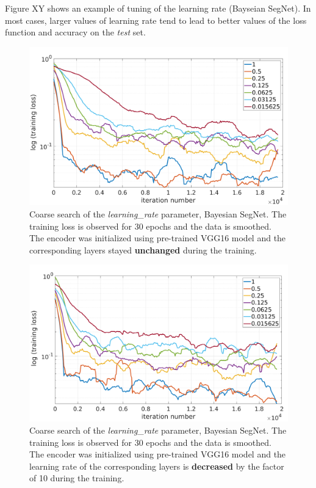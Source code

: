 Figure XY shows an example of tuning of the learning rate (Bayseian SegNet). In most cases, larger values of learning rate tend to lead to better values of the loss function and accuracy on the \textit{test} set.  

\begin{figure}[htb]
	\begin{center}
		\includegraphics*[width=14cm, keepaspectratio]{obr/bayes_full_rough.png}
	\end{center}
	\vspace{5mm}
	\caption{Coarse search of the \textit{learning\_rate} parameter, Bayesian SegNet. The training loss is observed for 30 epochs and the data is smoothed. The encoder was initialized using pre-trained VGG16 model and the corresponding layers stayed \textbf{unchanged} during the training.} 
	\label{}
\end{figure}

\vspace{5mm}
\begin{figure}[htb]
	\begin{center}
		\includegraphics*[width=14cm, keepaspectratio]{obr/bayes_full_rough_2.png}
	\end{center}
	\vspace{5mm}
	\caption{Coarse search of the \textit{learning\_rate} parameter, Bayesian SegNet. The training loss is observed for 30 epochs and the data is smoothed. The encoder was initialized using pre-trained VGG16 model and the learning rate of the corresponding layers is \textbf{decreased} by the factor of 10 during the training.} 
	\label{}
\end{figure}


